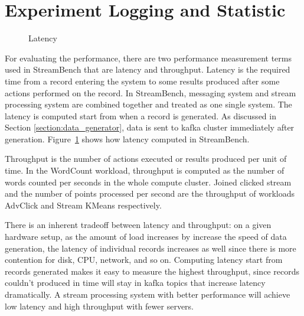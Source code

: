 \section{Experiment Logging and Statistic}
\label{section:log_statistic}
\begin{figure}
  \begin{center}
   \caption{Latency}
   \label{fig:latency}
  \end{center}
\end{figure}

For evaluating the performance, there are two performance measurement terms used in StreamBench that are latency and throughput. Latency is the required time from a record entering the system to some results produced after some actions performed on the record. In StreamBench, messaging system and stream processing system are combined together and treated as one single system. The latency is computed start from when a record is generated. As discussed in Section \ref{section:data_generator}, data is sent to kafka cluster immediately after generation. Figure~\ref{fig:latency} shows how latency computed in StreamBench. 

Throughput is the number of actions executed or results produced per unit of time. In the WordCount workload, throughput is computed as the number of words counted per seconds in the whole compute cluster. Joined clicked stream and the number of points processed per second are the throughput of workloads AdvClick and Stream KMeans respectively.

There is an inherent tradeoff between latency and throughput: on a given hardware setup, as the amount of load increases by increase the speed of data generation, the latency of individual records increases as well since there is more contention for disk, CPU, network, and so on. Computing latency start from records generated makes it easy to measure the highest throughput, since records couldn't produced in time will stay in kafka topics that increase latency dramatically. A stream processing system with better performance will achieve low latency and high throughput with fewer servers.

